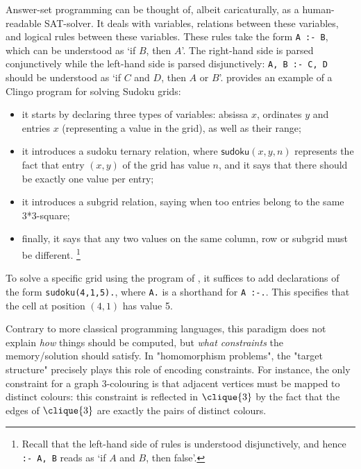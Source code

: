 Answer-set programming can be thought of, albeit caricaturally, as a human-readable
SAT-solver. It deals with variables, relations between these variables,
and logical rules between these variables. These rules take the form
\lstinline|A :- B|, which can be understood as `if $B$, then $A$'.
The right-hand side is parsed conjunctively while the left-hand side is parsed disjunctively:
\lstinline|A, B :- C, D| should be understood as `if $C$ and $D$, then $A$ or $B$'.
 provides
an example of a Clingo program for solving Sudoku grids:
\begin{itemize}
	\item it starts by declaring three types of variables: absissa $x$, ordinates $y$ and entries $x$ (representing a value in the grid), as well as their range;
	\item it introduces a \textsf{sudoku} ternary relation, where $\textsf{sudoku}(x,y,n)$
		represents the fact that entry $(x,y)$ of the grid has value $n$,
		and it says that there should be exactly one value per entry;
	\item it introduces a \textsf{subgrid} relation, saying when too entries
		belong to the same 3*3-square;
	\item finally, it says that any two values on the same column, row or subgrid
		must be different.%
		\footnote{Recall that the left-hand side of rules is understood disjunctively,
		and hence \lstinline|:- A, B| reads as `if $A$ and $B$, then false'.}
\end{itemize}
To solve a specific grid using the program of ,
it suffices to add declarations of the form \lstinline|sudoku(4,1,5).|,
where \lstinline|A.| is a shorthand for \lstinline|A :-.|.
This specifies that the cell at position $(4,1)$ has value 5.


Contrary to more classical programming languages, this paradigm does not explain \emph{how} things
should be computed, but \emph{what constraints} the memory/solution should satisfy.
In "homomorphism problems", the "target structure" precisely plays this role of
encoding constraints. For instance, the only constraint for a graph $3$-colouring is that
adjacent vertices must be mapped to distinct colours: this constraint is
reflected in $\clique{3}$ by the fact that the edges of $\clique{3}$ are exactly the pairs
of distinct colours.

